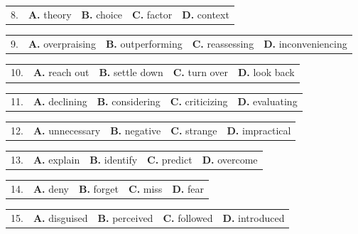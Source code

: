 \documentclass[UTF8,11pt]{ctexart}
\begin{document}
\noindent\begin{tabularx}{\linewidth}{@{}lXXXX@{}}8. & \textbf{A.} theory & \textbf{B.} choice & \textbf{C.} factor & \textbf{D.} context\\\end{tabularx}\par

\noindent\begin{tabularx}{\linewidth}{@{}lXXXX@{}}9. & \textbf{A.} overpraising & \textbf{B.} outperforming & \textbf{C.} reassessing & \textbf{D.} inconveniencing\\\end{tabularx}\par

\noindent\begin{tabularx}{\linewidth}{@{}lXXXX@{}}10. & \textbf{A.} reach out & \textbf{B.} settle down & \textbf{C.} turn over & \textbf{D.} look back\\\end{tabularx}\par

\noindent\begin{tabularx}{\linewidth}{@{}lXXXX@{}}11. & \textbf{A.} declining & \textbf{B.} considering & \textbf{C.} criticizing & \textbf{D.} evaluating\\\end{tabularx}\par

\noindent\begin{tabularx}{\linewidth}{@{}lXXXX@{}}12. & \textbf{A.} unnecessary & \textbf{B.} negative & \textbf{C.} strange & \textbf{D.} impractical\\\end{tabularx}\par

\noindent\begin{tabularx}{\linewidth}{@{}lXXXX@{}}13. & \textbf{A.} explain & \textbf{B.} identify & \textbf{C.} predict & \textbf{D.} overcome\\\end{tabularx}\par

\noindent\begin{tabularx}{\linewidth}{@{}lXXXX@{}}14. & \textbf{A.} deny & \textbf{B.} forget & \textbf{C.} miss & \textbf{D.} fear\\\end{tabularx}\par

\noindent\begin{tabularx}{\linewidth}{@{}lXXXX@{}}15. & \textbf{A.} disguised & \textbf{B.} perceived & \textbf{C.} followed & \textbf{D.} introduced\\\end{tabularx}\par
\end{document}
